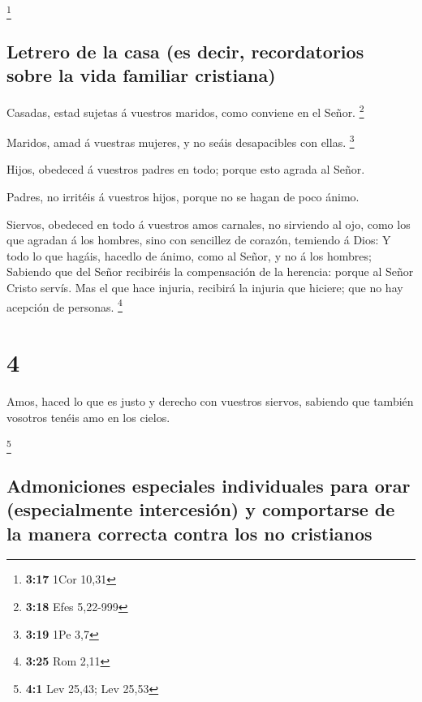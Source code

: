 \footnote{\textbf{3:17} 1Cor 10,31}

\hypertarget{letrero-de-la-casa-es-decir-recordatorios-sobre-la-vida-familiar-cristiana}{%
\subsection{Letrero de la casa (es decir, recordatorios sobre la vida
familiar
cristiana)}\label{letrero-de-la-casa-es-decir-recordatorios-sobre-la-vida-familiar-cristiana}}

 Casadas, estad sujetas á vuestros maridos, como conviene
en el Señor. \footnote{\textbf{3:18} Efes 5,22-999}

 Maridos, amad á vuestras mujeres, y no seáis
desapacibles con ellas. \footnote{\textbf{3:19} 1Pe 3,7}

 Hijos, obedeced á vuestros padres en todo; porque esto
agrada al Señor.

 Padres, no irritéis á vuestros hijos, porque no se hagan
de poco ánimo.

 Siervos, obedeced en todo á vuestros amos carnales, no
sirviendo al ojo, como los que agradan á los hombres, sino con sencillez
de corazón, temiendo á Dios:  Y todo lo que hagáis,
hacedlo de ánimo, como al Señor, y no á los hombres; 
Sabiendo que del Señor recibiréis la compensación de la herencia: porque
al Señor Cristo servís.  Mas el que hace injuria,
recibirá la injuria que hiciere; que no hay acepción de personas.
\footnote{\textbf{3:25} Rom 2,11}

\hypertarget{section-3}{%
\section{4}\label{section-3}}

 Amos, haced lo que es justo y derecho con vuestros
siervos, sabiendo que también vosotros tenéis amo en los cielos.

\footnote{\textbf{4:1} Lev 25,43; Lev 25,53}

\hypertarget{admoniciones-especiales-individuales-para-orar-especialmente-intercesiuxf3n-y-comportarse-de-la-manera-correcta-contra-los-no-cristianos}{%
\subsection{Admoniciones especiales individuales para orar
(especialmente intercesión) y comportarse de la manera correcta contra
los no
cristianos}\label{admoniciones-especiales-individuales-para-orar-especialmente-intercesiuxf3n-y-comportarse-de-la-manera-correcta-contra-los-no-cristianos}}

